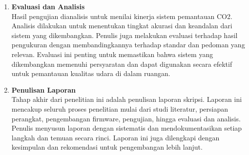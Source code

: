 \begin{enumerate}
    \item \textbf{Evaluasi dan Analisis} \\
        Hasil pengujian dianalisis untuk menilai kinerja sistem pemantauan CO2. Analisis dilakukan untuk menentukan tingkat akurasi dan keandalan dari sistem yang dikembangkan. Penulis juga melakukan evaluasi terhadap hasil pengukuran dengan membandingkannya terhadap standar dan pedoman yang relevan. Evaluasi ini penting untuk memastikan bahwa sistem yang dikembangkan memenuhi persyaratan dan dapat digunakan secara efektif untuk pemantauan kualitas udara di dalam ruangan.

    \item \textbf{Penulisan Laporan} \\
        Tahap akhir dari penelitian ini adalah penulisan laporan skripsi. Laporan ini mencakup seluruh proses penelitian mulai dari studi literatur, persiapan perangkat, pengembangan firmware, pengujian, hingga evaluasi dan analisis. Penulis menyusun laporan dengan sistematis dan mendokumentasikan setiap langkah dan temuan secara rinci. Laporan ini juga dilengkapi dengan kesimpulan dan rekomendasi untuk pengembangan lebih lanjut.

\end{enumerate}
